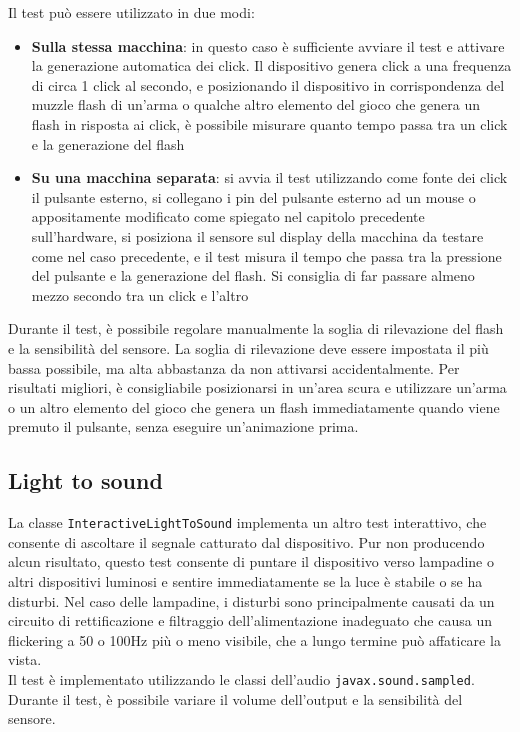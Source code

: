 Il test può essere utilizzato in due modi:\begin{itemize}
	\item \textbf{Sulla stessa macchina}: in questo caso è sufficiente avviare il test e attivare la generazione automatica dei click. Il dispositivo genera click a una frequenza di circa 1 click al secondo, e posizionando il dispositivo in corrispondenza del muzzle flash di un'arma o qualche altro elemento del gioco che genera un flash in risposta ai click, è possibile misurare quanto tempo passa tra un click e la generazione del flash
	\item \textbf{Su una macchina separata}: si avvia il test utilizzando come fonte dei click il pulsante esterno, si collegano i pin del pulsante esterno ad un mouse o appositamente modificato come spiegato nel capitolo precedente sull'hardware, si posiziona il sensore sul display della macchina da testare come nel caso precedente, e il test misura il tempo che passa tra la pressione del pulsante e la generazione del flash. Si consiglia di far passare almeno mezzo secondo tra un click e l'altro
\end{itemize}

Durante il test, è possibile regolare manualmente la soglia di rilevazione del flash e la sensibilità del sensore. La soglia di rilevazione deve essere impostata il più bassa possibile, ma alta abbastanza da non attivarsi accidentalmente. Per risultati migliori, è consigliabile posizionarsi in un'area scura e utilizzare un'arma o un altro elemento del gioco che genera un flash immediatamente quando viene premuto il pulsante, senza eseguire un'animazione prima.

\subsection{Light to sound}
La classe \texttt{InteractiveLightToSound} implementa un altro test interattivo, che consente di ascoltare il segnale catturato dal dispositivo. Pur non producendo alcun risultato, questo test consente di puntare il dispositivo verso lampadine o altri dispositivi luminosi e sentire immediatamente se la luce è stabile o se ha disturbi. Nel caso delle lampadine, i disturbi sono principalmente causati da un circuito di rettificazione e filtraggio dell'alimentazione inadeguato che causa un flickering a 50 o 100Hz più o meno visibile, che a lungo termine può affaticare la vista.\\
Il test è implementato utilizzando le classi dell'audio \texttt{javax.sound.sampled}. Durante il test, è possibile variare il volume dell'output e la sensibilità del sensore.

